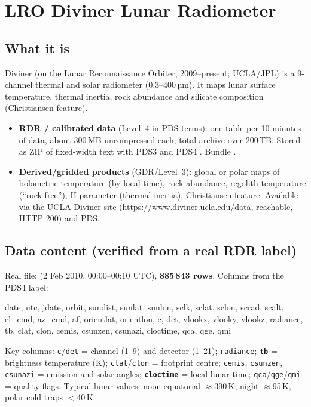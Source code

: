 \documentclass[10pt,a4paper]{article}
\begin{document}
\section{LRO Diviner Lunar Radiometer}
\subsection{What it is}
Diviner (on the Lunar Reconnaissance Orbiter, 2009--present; UCLA/JPL) is a 9-channel thermal and solar radiometer (0.3--400\,µm). It maps lunar surface temperature, thermal inertia, rock abundance and silicate composition (Christiansen feature).
\begin{itemize}
\item \textbf{RDR / calibrated data} (Level~4 in PDS terms): one table per 10 minutes of data, about 300\,MB uncompressed each; total archive over 200\,TB. Stored as ZIP of fixed-width text  with PDS3  and PDS4 . Bundle .
\item \textbf{Derived/gridded products} (GDR/Level~3): global or polar maps of bolometric temperature (by local time), rock abundance, regolith temperature (``rock-free''), H-parameter (thermal inertia), Christiansen feature. Available via the UCLA Diviner site (\url{https://www.diviner.ucla.edu/data}, reachable, HTTP 200) and PDS.
\end{itemize}

\subsection{Data content (verified from a real RDR label)}
Real file:  (2 Feb 2010, 00:00--00:10 UTC), \textbf{885\,843 rows}. Columns from the PDS4 label:
\begin{center}\footnotesize\ttfamily
\begin{minipage}{0.95\textwidth}\raggedright
date, utc, jdate, orbit, sundist, sunlat, sunlon, sclk, sclat, sclon, scrad, scalt, el\_cmd, az\_cmd, af, orientlat, orientlon, c, det, vlookx, vlooky, vlookz, radiance, tb, clat, clon, cemis, csunzen, csunazi, cloctime, qca, qge, qmi
\end{minipage}\end{center}
Key columns: \texttt{c}/\texttt{det} = channel (1--9) and detector (1--21); \texttt{radiance}; \textbf{\texttt{tb}} = brightness temperature (K); \texttt{clat}/\texttt{clon} = footprint centre; \texttt{cemis}, \texttt{csunzen}, \texttt{csunazi} = emission and solar angles; \textbf{\texttt{cloctime}} = local lunar time; \texttt{qca}/\texttt{qge}/\texttt{qmi} = quality flags. Typical lunar values: noon equatorial $\approx$390\,K, night $\approx$95\,K, polar cold traps $<$40\,K.
\end{document}
